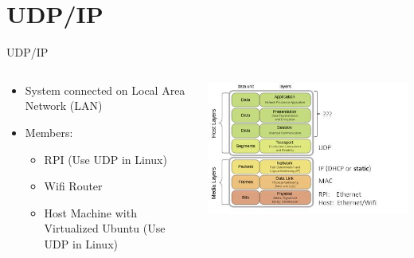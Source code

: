 \section{UDP/IP}
\begin{frame}{UDP/IP}
    \begin{columns}
        \begin{column}{0.5\textwidth}
            \begin{itemize}
                \item System connected on Local Area Network (LAN)
                \item Members: 
                \begin{itemize}
                    \item RPI (Use UDP in Linux)
                    \item Wifi Router
                    \item Host Machine with Virtualized Ubuntu (Use UDP in Linux)
                \end{itemize}
            \end{itemize}
        \end{column}
        \begin{column}{0.5\textwidth}
            \centering
            \includegraphics[]{trainingmaterials/project2-iot/ip.jpg}
        \end{column}
    \end{columns}
\end{frame}

